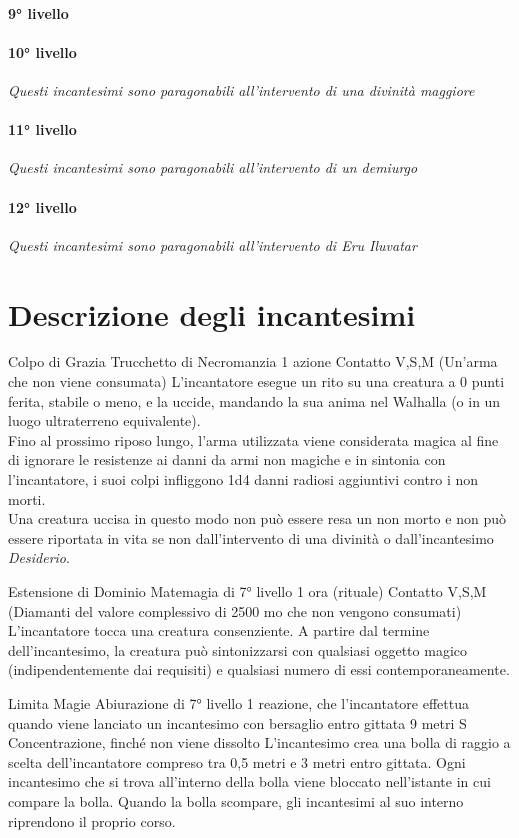 \paragraph{9° livello}
\paragraph{10° livello} \textit{Questi incantesimi sono paragonabili all'intervento di una divinità maggiore}
\paragraph{11° livello} \textit{Questi incantesimi sono paragonabili all'intervento di un demiurgo}
\paragraph{12° livello} \textit{Questi incantesimi sono paragonabili all'intervento di Eru Iluvatar}

\section{Descrizione degli incantesimi}

\DndSpellHeader%
  {Colpo di Grazia}
  {Trucchetto di Necromanzia}
  {1 azione}
  {Contatto}
  {V,S,M (Un'arma che non viene consumata)}
L'incantatore esegue un rito su una creatura a 0 punti ferita, stabile o meno, e la uccide, mandando la sua anima nel Walhalla (o in un luogo ultraterreno equivalente).\\ Fino al prossimo riposo lungo, l'arma utilizzata viene considerata magica al fine di ignorare le resistenze ai danni da armi non magiche e in sintonia con l'incantatore, i suoi colpi infliggono 1d4 danni radiosi aggiuntivi contro i non morti. \\ Una creatura uccisa in questo modo non può essere resa un non morto e non può essere riportata in vita se non dall'intervento di una divinità o dall'incantesimo \textit{Desiderio}.

\DndSpellHeader%
  {Estensione di Dominio}
  {Matemagia di 7° livello}
  {1 ora (rituale)}
  {Contatto}
  {V,S,M (Diamanti del valore complessivo di 2500 mo che non vengono consumati)}
  L'incantatore tocca una creatura consenziente. A partire dal termine dell'incantesimo, la creatura può sintonizzarsi con qualsiasi oggetto magico (indipendentemente dai requisiti) e qualsiasi numero di essi contemporaneamente.

\DndSpellHeader%
  {Limita Magie}
  {Abiurazione di 7° livello}
  {1 reazione, che l'incantatore effettua quando viene lanciato un incantesimo con bersaglio entro gittata}
  {9 metri}
  {S}
  {Concentrazione, finché non viene dissolto}
L'incantesimo crea una bolla di raggio a scelta dell'incantatore compreso tra 0,5 metri e 3 metri entro gittata. Ogni incantesimo che si trova all'interno della bolla viene bloccato nell'istante in cui compare la bolla. Quando la bolla scompare, gli incantesimi al suo interno riprendono il proprio corso.

